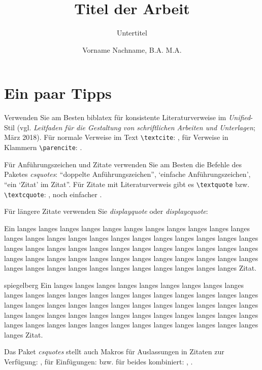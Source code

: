 \documentclass[naustrian]{univie-ling-thesis}
\author{Vorname Nachname, B.A. M.A.}
\title{Titel der Arbeit}
\subtitle{Untertitel}
\begin{document}
\maketitle

\tableofcontents

\chapter{Ein paar Tipps}\label{cha:hinweise}

Verwenden Sie am Besten \textsf{biblatex} für konsistente Literaturverweise im \emph{Unified}-Stil (vgl. \emph{Leitfaden für die Gestaltung von
	schriftlichen Arbeiten und Unterlagen}; März 2018).
Für normale Verweise im Text \verb|\textcite|: \textcite[22]{brandt}, für Verweise in Klammern \verb|\parencite|: \parencite{brandt}.

Für Anführungszeichen und Zitate verwenden Sie am Besten die Befehle des Paketes \emph{csquotes}: \enquote{doppelte Anführungszeichen},
\enquote*{einfache Anführungszeichen}, \enquote{ein \enquote{Zitat} im Zitat}. Für Zitate mit Literaturverweis gibt es
\verb|\textquote| bzw. \verb|\textcquote|: , noch einfacher
.

Für längere Zitate verwenden Sie \emph{displayquote} oder \emph{displaycquote}:

\begin{displayquote}
	Ein langes langes langes langes langes langes langes langes langes langes langes langes langes langes langes langes langes langes
	langes langes langes langes langes langes langes langes langes langes langes langes langes langes langes langes langes langes langes langes
	langes langes langes langes langes langes langes langes langes langes langes langes langes langes langes langes langes langes langes langes
	Zitat.
\end{displayquote}

\begin{displaycquote}[202]{spiegelberg}
	Ein langes langes langes langes langes langes langes langes langes langes langes langes langes langes langes langes langes langes
	langes langes langes langes langes langes langes langes langes langes langes langes langes langes langes langes langes langes langes langes
	langes langes langes langes langes langes langes langes langes langes langes langes langes langes langes langes langes langes langes langes
	Zitat.
\end{displaycquote}
%
Das Paket \emph{csquotes} stellt auch Makros für Auslassungen in Zitaten zur Verfügung: \textelp{}, für Einfügungen: 
bzw. für beides kombiniert: , .
\end{document}
